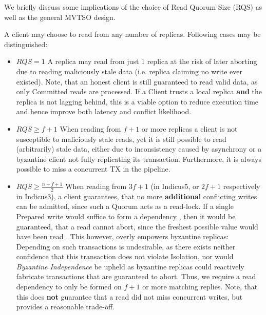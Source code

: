 We briefly discuss some implications of the choice of Read Quorum Size (RQS) as well as the general MVTSO design.
 
A client may choose to read from any number of replicas. Following cases may be distinguished:
\begin{itemize}
\item \textbf{$RQS = 1$} A replica may read from just 1 replica at the risk of later aborting due to reading maliciously stale data (i.e. replica claiming no write ever existed). Note, that an honest client is still guaranteed to read valid data, as only Committed reads are processed. If a Client trusts a local replica \textbf{and} the replica is not lagging behind, this is a viable option to reduce execution time and hence improve both latency and conflict likelihood.
\item \textbf{$RQS \geq f+1$} When reading from $f+1$ or more replicas a client is not susceptible to maliciously stale reads, yet it is still possible to read (arbitrarily) stale data, either due to inconsistency caused by asynchrony or a byzantine client not fully replicating its transaction. Furthermore, it is always possible to miss a concurrent TX in the pipeline.
\item \textbf{$RQS \geq \frac{n+f+1}{2}$} When reading from $3f+1$ (in Indicus5, or $2f+1$ respectively in Indicus3), a client guarantees, that no more \textbf{additional} conflicting writes can be admitted, since such a Quorum acts as a read-lock. If a single Prepared write would suffice to form a dependency , then it would be guaranteed, that a read cannot abort, since the freshest possible value would have been read . This however, overly empowers byzantine replicas:  Depending on such transactions is undesirable, as there exists neither confidence that this transaction does not violate Isolation, nor would \textit{Byzantine Independence} be upheld as byzantine replicas could reactively fabricate transactions that are guaranteed to abort. Thus, we require a read dependency to only be formed on $f+1$ or more matching replies. Note, that this does \textbf{not} guarantee that a read did not miss concurrent writes, but provides a reasonable trade-off.

\end{itemize}





